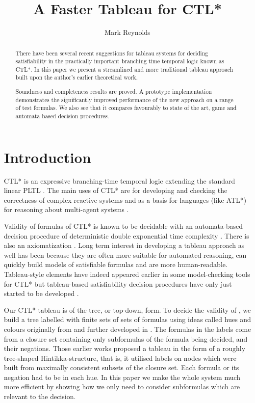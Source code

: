 \documentclass[submission,copyright,creativecommons]{eptcs}
\title{A Faster Tableau for CTL*}
\author{Mark Reynolds
\institute{School of Computer Science and Software Engineering,
The University of Western Australia}
\email{mark.reynolds@uwa.edu.au}
}
\begin{document}
\maketitle


\begin{abstract}
There have been several recent suggestions for tableau systems for
deciding satisfiability in the practically important branching time
temporal logic known as CTL*.
In this paper we present a streamlined and more traditional tableau
approach built upon the author's earlier theoretical work.

Soundness and completeness results are proved. A prototype implementation
demonstrates the significantly improved performance of the new approach on
a range of test formulas.
We also see that it compares favourably  to state of the art, game and automata based
decision procedures.
\end{abstract}







\section{Introduction}
\label{sec:intro}
CTL* \cite{+emsi,+emhal86}
is an expressive branching-time
temporal logic 
extending the standard
linear 
PLTL \cite{Pnu77}.
The main uses of CTL*
are
for developing and checking the
correctness of complex
reactive systems  \cite{Eme90}
and as a basis for
languages (like ATL*)
for reasoning about multi-agent systems 
\cite{DBLP:conf/lfcs/GorankoS09}.

Validity of
formulas of CTL* is known to be decidable
with an automata-based decision procedure
of deterministic double exponential
time complexity \cite{+emsi,EJ88,VaS85}.
There is also an axiomatization \cite{Rey:ctlstar}.
Long term interest in 
developing a tableau approach as well
has been because they
are often more suitable for automated reasoning,
can quickly build
models of satisfiable formulas
and are more human-readable.
Tableau-style elements 
have indeed appeared earlier in some model-checking
tools for CTL*
but 
tableau-based satisfiability
decision procedures have only
just started to be developed
\cite{Rey:startab,FLL10}.

Our CTL* tableau
is of the 
tree, or top-down, form.
To decide the validity of ,
we build a tree
labelled with finite
sets of sets of formulas
using ideas called hues and colours originally from
\cite{Rey:ctlstar}
and further developed
in \cite{Rey:startabFM,Rey:startab}.
The formulas
in the labels come from a closure set containing
only subformulas of the formula being decided,
and their negations.
Those earlier works proposed
a tableau in the form of a roughly tree-shaped
Hintikka-structure,
that is,
it utilised labels on nodes which were
built from maximally consistent subsets of 
the closure set.
Each formula or its negation had to be in 
each hue.
In this paper we make the whole 
system much more efficient
by showing how we only need to 
consider subformulas
which are relevant to the decision.
\end{document}
